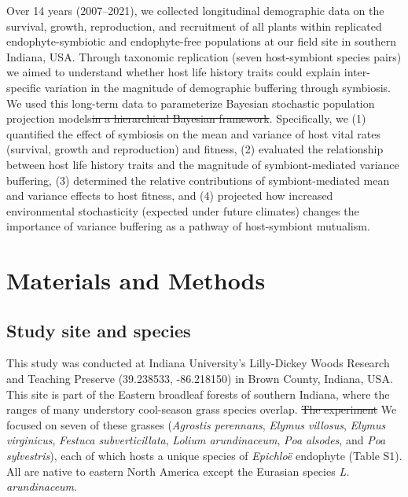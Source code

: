\documentclass[lineno, sn-basic]{sn-jnl}%
\providecommand{\DIFadd}[1]{{\protect\color{blue}#1}} %
\providecommand{\DIFdel}[1]{{\protect\color{red}\protect\scriptsize\sout{#1}}}
\providecommand{\DIFadd}[1]{{\protect\color{blue}\uwave{#1}}} %
\providecommand{\DIFdel}[1]{{\protect\color{red}\sout{#1}}}                      %
\providecommand{\DIFaddbegin}{} %
\providecommand{\DIFaddend}{} %
\providecommand{\DIFdelbegin}{} %
\providecommand{\DIFdelend}{} %
\newcommand{\DIFscaledelfig}{0.5}
\newlength{\DIFdelgraphicswidth} %
\newlength{\DIFdelgraphicsheight} %
\newcommand{\DIFaddincludegraphics}[2][]{{\color{blue}\fbox{\DIFOincludegraphics[#1]{#2}}}} %
\newcommand{\DIFdelincludegraphics}[2][]{%
\sbox{\DIFdelgraphicsbox}{\DIFOincludegraphics[#1]{#2}}%
\settoboxwidth{\DIFdelgraphicswidth}{\DIFdelgraphicsbox} %
\settoboxtotalheight{\DIFdelgraphicsheight}{\DIFdelgraphicsbox} %
\scalebox{\DIFscaledelfig}{%
\parbox[b]{\DIFdelgraphicswidth}{\usebox{\DIFdelgraphicsbox}\\[-\baselineskip] \rule{\DIFdelgraphicswidth}{0em}}\llap{\resizebox{\DIFdelgraphicswidth}{\DIFdelgraphicsheight}{%
\setlength{\unitlength}{\DIFdelgraphicswidth}%
\begin{picture}(1,1)%
\thicklines\linethickness{2pt} %
{\color[rgb]{1,0,0}\put(0,0){\framebox(1,1){}}}%
{\color[rgb]{1,0,0}\put(0,0){\line( 1,1){1}}}%
{\color[rgb]{1,0,0}\put(0,1){\line(1,-1){1}}}%
\end{picture}%
}\hspace*{3pt}}} %
} %
\DeclareRobustCommand{\DIFaddbegin}{\DIFOaddbegin \let\includegraphics\DIFaddincludegraphics} %
\DeclareRobustCommand{\DIFaddend}{\DIFOaddend \let\includegraphics\DIFOincludegraphics} %
\DeclareRobustCommand{\DIFdelbegin}{\DIFOdelbegin \let\includegraphics\DIFdelincludegraphics} %
\DeclareRobustCommand{\DIFdelend}{\DIFOaddend \let\includegraphics\DIFOincludegraphics} %
\begin{document}
Over 14 years (2007--2021), we collected longitudinal demographic data on the survival, growth, reproduction, and recruitment of all plants within replicated endophyte-symbiotic and endophyte-free populations at our field site in southern Indiana, USA. 
Through taxonomic replication (seven host-symbiont species pairs) we aimed to understand whether host life history traits could explain inter-specific variation in the magnitude of demographic buffering through symbiosis. 
We used this long-term data to parameterize \DIFaddbegin \DIFadd{Bayesian }\DIFaddend stochastic population projection models\DIFdelbegin \DIFdel{in a hierarchical Bayesian framework}\DIFdelend . 
Specifically, we  (1) quantified the effect of symbiosis on the mean and variance of host vital rates (survival, growth and reproduction) and fitness, (2) evaluated the relationship between host life history traits and the magnitude of symbiont-mediated variance buffering, (3) determined the relative contributions of symbiont-mediated mean and variance effects to host fitness, and (4) projected how increased environmental stochasticity (expected under future climates) changes the importance of variance buffering as a pathway of host-symbiont mutualism. 

\section*{Materials and Methods}
\subsection*{Study site and species}
This study was conducted at Indiana University's Lilly-Dickey Woods Research and Teaching Preserve (39.238533, -86.218150) in Brown County, Indiana, USA. 
This site is part of the Eastern broadleaf forests of southern Indiana, where the ranges of many understory cool-season grass species overlap. 
\DIFdelbegin \DIFdel{The experiment }\DIFdelend \DIFaddbegin \DIFadd{We }\DIFaddend focused on seven of these grasses (\emph{Agrostis perennans}, \emph{Elymus villosus}, \emph{Elymus virginicus}, \emph{Festuca subverticillata}, \emph{Lolium arundinaceum}, \emph{Poa alsodes}, and \emph{Poa sylvestris}), each of which hosts a unique species of \emph{Epichlo\"e} endophyte (Table S1). 
All are native to eastern North America except the Eurasian species \emph{L. arundinaceum}.
\end{document}
